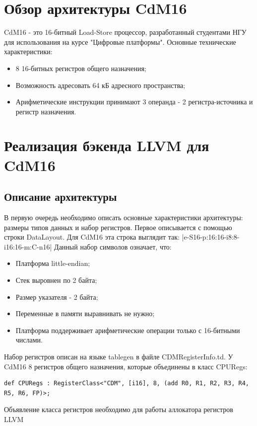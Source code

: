 \documentclass[a4paper,14pt]{extarticle}
\begin{document}
\pagebreak
\section{Обзор архитектуры CdM16}
CdM16 - это 16-битный Load-Store процессор, разработанный студентами НГУ для использования на курсе "Цифровые платформы"\cite{cdm:slides}. Основные технические характеристики:
\begin{itemize}
	\item 8 16-битных регистров общего назначения;
	\item Возможность адресовать 64 кБ адресного пространства;
	\item Арифметические инструкции принимают 3 операнда - 2 регистра-источника и регистр назначения.
\end{itemize}

\pagebreak
\section{Реализация бэкенда LLVM для CdM16}
\subsection{Описание архитектуры}
В первую очередь необходимо описать основные характеристики архитектуры: размеры типов данных и набор регистров. Первое описывается с помощью строки DataLayout. Для CdM16 эта строка выглядит так: |e-S16-p:16:16-i8:8-i16:16-m:C-n16|
Данный набор символов означает, что:
\begin{itemize}
	\item Платформа little-endian;
	\item Стек выровнен по 2 байта;
	\item Размер указателя - 2 байта;
	\item Переменные в памяти выравнивать не нужно;
	\item Платформа поддерживает арифметические операции только с 16-битными числами.
\end{itemize}

Набор регистров описан на языке tablegen в файле CDMRegisterInfo.td. У CdM16 8 регистров общего назначения, которые объединены в класс CPURegs:
\begin{verbatim}
def CPURegs : RegisterClass<"CDM", [i16], 8, (add R0, R1, R2, R3, R4, R5, R6, FP)>;
\end{verbatim}
Объявление класса регистров необходимо для работы аллокатора регистров LLVM
\end{document}

